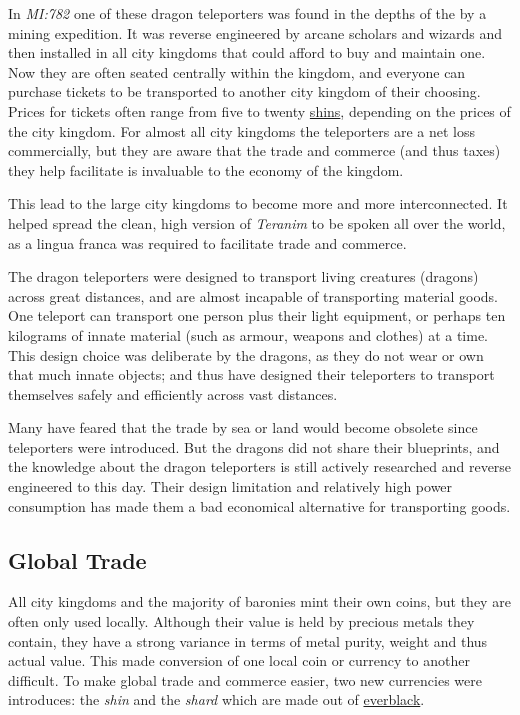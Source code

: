 In \emph{MI:782} one of these dragon teleporters was found in the depths of
the  by a mining expedition. It was reverse
engineered by arcane scholars and wizards and then installed in all city
kingdoms that could afford to buy and maintain one. Now they are often seated
centrally within the kingdom, and everyone can purchase tickets to be
transported to another city kingdom of their choosing. Prices for tickets
often range from five to twenty \hyperref[sec:Shin]{shins}, depending on the
prices of the city kingdom. For almost all city kingdoms the teleporters are a
net loss commercially, but they are aware that the trade and commerce (and
thus taxes) they help facilitate is invaluable to the economy of the kingdom.

This lead to the large city kingdoms to become more and more interconnected.
It helped spread the clean, high version of \emph{Teranim} to be spoken all
over the world, as a lingua franca was required to facilitate trade and
commerce.

The dragon teleporters were designed to transport living creatures (dragons)
across great distances, and are almost incapable of transporting material
goods. One teleport can transport one person plus their light equipment, or
perhaps ten kilograms of innate material (such as armour, weapons and
clothes) at a time. This design choice was deliberate by the dragons, as they
do not wear or own that much innate objects; and thus have designed their
teleporters to transport themselves safely and efficiently across vast
distances.

Many have feared that the trade by sea or land would become obsolete since
teleporters were introduced. But the dragons did not share their blueprints,
and the knowledge about the dragon teleporters is still actively researched
and reverse engineered to this day. Their design limitation and relatively
high power consumption has made them a bad economical alternative for
transporting goods.

\subsection{Global Trade}
\label{sec:Trade}

All city kingdoms and the majority of baronies mint their own coins, but they
are often only used locally. Although their value is held by precious metals
they contain, they have a strong variance in terms of metal purity, weight and
thus actual value. This made conversion of one local coin or currency to
another difficult. To make global trade and commerce easier, two new
currencies were introduces: the \emph{shin} and the \emph{shard} which are
made out of \hyperref[sec:Everblack]{everblack}.

